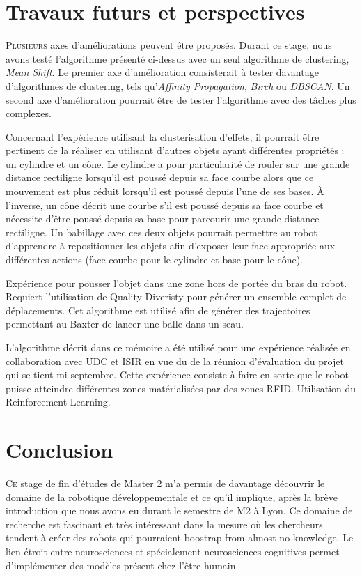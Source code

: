 \documentclass{llncs}
\begin{document}
\section{Travaux futurs et perspectives}

\lettrine{P}{lusieurs} axes d'améliorations peuvent être proposés. Durant ce stage, nous avons testé l'algorithme présenté ci-dessus avec un seul algorithme de clustering, \textit{Mean Shift}. Le premier axe d'amélioration consisterait à tester davantage d'algorithmes de clustering, tels qu'\textit{Affinity Propagation}, \textit{Birch} ou \textit{DBSCAN}. Un second axe d'amélioration pourrait être de tester l'algorithme avec des tâches plus complexes.

Concernant l'expérience utilisant la clusterisation d'effets, il pourrait être pertinent de la réaliser en utilisant d'autres objets ayant différentes propriétés : un cylindre et un cône. Le cylindre a pour particularité de rouler sur une grande distance rectiligne lorsqu'il est poussé depuis sa face courbe alors que ce mouvement est plus réduit lorsqu'il est poussé depuis l'une de ses bases. À l'inverse, un cône décrit une courbe s'il est poussé depuis sa face courbe et nécessite d'être poussé depuis sa base pour parcourir une grande distance rectiligne. Un babillage avec ces deux objets pourrait permettre au robot d'apprendre à repositionner les objets afin d'exposer leur face appropriée aux différentes actions (face courbe pour le cylindre et base pour le cône).

Expérience pour pousser l'objet dans une zone hors de portée du bras du robot. Requiert l'utilisation de Quality Diveristy pour générer un ensemble complet de déplacements. Cet algorithme est utilisé afin de générer des trajectoires permettant au Baxter de lancer une balle dans un seau. 

L'algorithme décrit dans ce mémoire a été utilisé pour une expérience réalisée en collaboration avec UDC et ISIR en vue du de la réunion d'évaluation du projet qui se tient mi-septembre. Cette expérience consiste à faire en sorte que le robot puisse atteindre différentes zones matérialisées par des zones RFID. Utilisation du Reinforcement Learning.






\section{Conclusion}

\lettrine{C}{e} stage de fin d'études de Master 2 m'a permis de davantage découvrir le domaine de la robotique développementale et ce qu'il implique, après la brève introduction que nous avons eu durant le semestre de M2 à Lyon. Ce domaine de recherche est fascinant et très intéressant dans la mesure où les chercheurs tendent à créer des robots qui pourraient boostrap from almost no knowledge. Le lien étroit entre neurosciences et spécialement neurosciences cognitives permet d'implémenter des modèles présent chez l'être humain.
\end{document}
